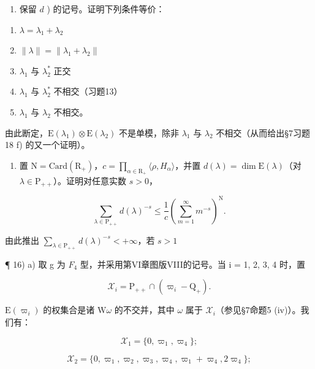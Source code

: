\begin{enumerate}
\def\labelenumi{\alph{enumi})}
\setcounter{enumi}{4}
\tightlist
\item
  保留 \(d\) ) 的记号。证明下列条件等价：
\end{enumerate}

\begin{enumerate}
\def\labelenumi{(\roman{enumi})}
\item
  \(\lambda = \lambda_{1} + \lambda_{2}\)
\item
  \(\| \lambda \| = \| \lambda_1 + \lambda_2 \|\)
\item
  \(\lambda_{1}\) 与 \(\lambda_2^*\) 正交
\item
  \(\lambda_{1}\) 与 \(\lambda_2^*\) 不相交（习题13）
\item
  \(\lambda_{1}\) 与 \(\lambda_{2}\) 不相交。
\end{enumerate}

由此断定，\(\mathrm{E}(\lambda_{1})\otimes\mathrm{E}(\lambda_{2})\) 不是单模，除非 \(\lambda_{1}\) 与 \(\lambda_{2}\) 不相交（从而给出§7习题18 f) 的又一个证明）。

\begin{enumerate}
\def\labelenumi{\arabic{enumi})}
\setcounter{enumi}{14}
\tightlist
\item
  置 \(\mathrm{N} = \mathrm{Card}(\mathrm{R}_{+})\)，\(c = \prod_{\alpha \in \mathrm{R}_{+}} \langle \rho, H_{\alpha} \rangle\)，并置 \(d(\lambda) = \dim \mathrm{E}(\lambda)\)（对 \(\lambda \in \mathrm{P}_{++}\)）。证明对任意实数 \(s > 0\)，
\end{enumerate}

\[
\sum_ {\lambda \in \mathrm{P} _ {+ +}} d (\lambda) ^ {- s} \leq \frac {1}{c} \left(\sum_ {m = 1} ^ {\infty} m ^ {- s}\right) ^ {\mathrm{N}}.
\]

由此推出 \(\sum_{\lambda \in \mathrm{P}_{+ + }}d(\lambda)^{-s} <   + \infty\)，若 \(s > 1\)

¶ 16) a) 取 g 为 \(F_{4}\) 型，并采用第VI章图版VIII的记号。当 i = 1, 2, 3, 4 时，置

\[
\mathcal {X} _ {i} = \mathrm{P} _ {+ +} \cap (\varpi_ {i} - \mathrm{Q} _ {+}).
\]

\(\mathrm{E}(\varpi_i)\) 的权集合是诸 \(\mathrm{W}\omega\) 的不交并，其中 \(\omega\) 属于 \(\mathcal{X}_i\)（参见§7命题5 (iv)）。我们有：

\[
\mathcal {X} _ {1} = \{0, \varpi_ {1}, \varpi_ {4} \};
\]

\[
\mathcal {X} _ {2} = \{0, \varpi_ {1}, \varpi_ {2}, \varpi_ {3}, \varpi_ {4}, \varpi_ {1} + \varpi_ {4}, 2 \varpi_ {4} \};
\]

